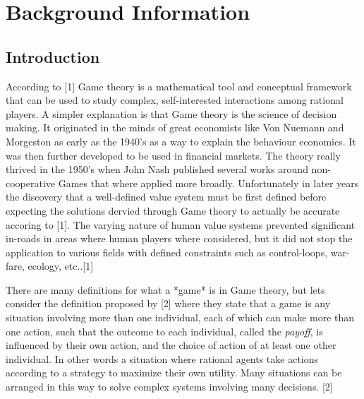 
\chapter{Background Information} %

\label{Chapter2} %


\section{Introduction}

According to [1] Game theory is a mathematical tool and conceptual 
framework that can be used to study complex, self-interested 
interactions among rational players. A simpler explanation is that 
Game theory is the science of decision making. It originated in the 
minds of great economists like Von Nuemann and Morgeston as early as 
the 1940's as a way to explain the behaviour economics. It was then 
further developed to be used in financial markets. The theory really 
thrived in the 1950's when John Nash published several works around 
non-cooperative Games that where applied more broadly. Unfortunately 
in later years the discovery that a well-defined value system must be
first defined before expecting the solutions dervied through Game theory 
to actually be accurate accoring to [1]. The varying nature of human value systems 
prevented significant in-roads in areas where human players where 
considered, but it did not stop the application to various fields 
with defined constraints such as control-loops, war-fare, ecology, etc..[1]

There are many definitions for what a *game* is in Game theory, but lets 
consider the definition proposed by [2] where they state that a game is 
any situation involving more than one individual, each of which can make 
more than one action, such that the outcome to each individual, called 
the \textit{payoff}, is influenced by their own action, and the choice of action 
of at least one other individual. In other words a situation where rational 
agents take actions according to a strategy to maximize their own utility. 
Many situations can be arranged in this way to solve complex systems 
involving many decisions. [2]

